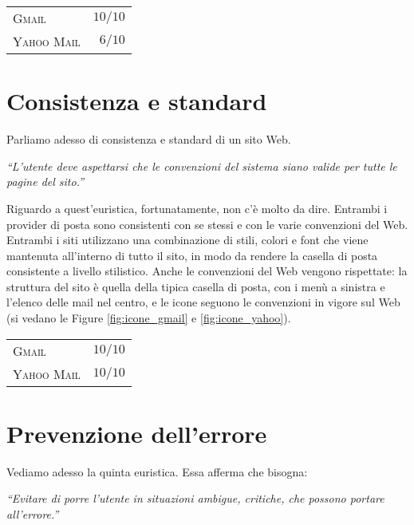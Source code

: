		\begin{flushleft}
			\begin{tabular}{lr}
				\textsc{Gmail} & $10/10$\\
				\textsc{Yahoo Mail} & $6/10$
			\end{tabular}
		\end{flushleft}
	
	\section{Consistenza e standard} \label{sec:consistenza_standard}
	
		Parliamo adesso di consistenza e standard di un sito Web.
		\begin{center}
			\begin{minipage}{0.7\textwidth}
				\textit{``L'utente deve aspettarsi che le convenzioni del sistema siano valide per tutte le pagine del sito.''}
			\end{minipage}
		\end{center}
		
		Riguardo a quest'euristica, fortunatamente, non c'è molto da dire. Entrambi i provider di posta sono consistenti con se stessi e con le varie convenzioni del Web. Entrambi i siti utilizzano una combinazione di stili, colori e font che viene mantenuta all'interno di tutto il sito, in modo da rendere la casella di posta consistente a livello stilistico. Anche le convenzioni del Web vengono rispettate: la struttura del sito è quella della tipica casella di posta, con i menù a sinistra e l'elenco delle mail nel centro, e le icone seguono le convenzioni in vigore sul Web (si vedano le Figure \ref{fig:icone_gmail} e \ref{fig:icone_yahoo}).
		
		\begin{flushleft}
			\begin{tabular}{lr}
				\textsc{Gmail} & $10/10$\\
				\textsc{Yahoo Mail} & $10/10$
			\end{tabular}
		\end{flushleft}
	
	\section{Prevenzione dell'errore} \label{sec:prevenzione_errore}
	
		Vediamo adesso la quinta euristica. Essa afferma che bisogna:
		\begin{center}
			\begin{minipage}{0.7\textwidth}
				\textit{``Evitare di porre l'utente in situazioni ambigue, critiche, che possono portare all'errore.''}
			\end{minipage}
		\end{center}
		
